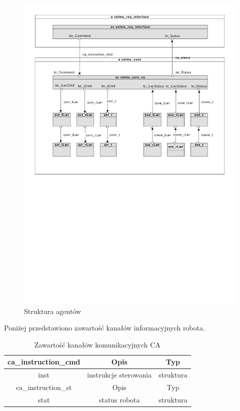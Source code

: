 \documentclass[]{article}
\begin{document}
\begin{figure}[H]
	\centering
	\includegraphics[width=0.8\linewidth]{main}
	\caption{Struktura agentów}
	\label{fig:agents}
\end{figure}

Poniżej przedstawiono zawartość kanałów informacyjnych robota.
\begin{table}[H]
	\begin{tabular}{||c|cc||}
		\hline\hline
		ca\_instruction\_cmd & Opis & Typ \\
		\hline\hline
		inst & instrukcje sterowania & struktura \\
		\hline\hline
		ca\_instruction\_st & Opis & Typ \\
		\hline\hline
		stat & status robota & struktura \\
		\hline
	\end{tabular}
	\caption{Zawartość kanałów komunikacyjnych CA}
	\label{tab:ca}
\end{table}
\end{document}
